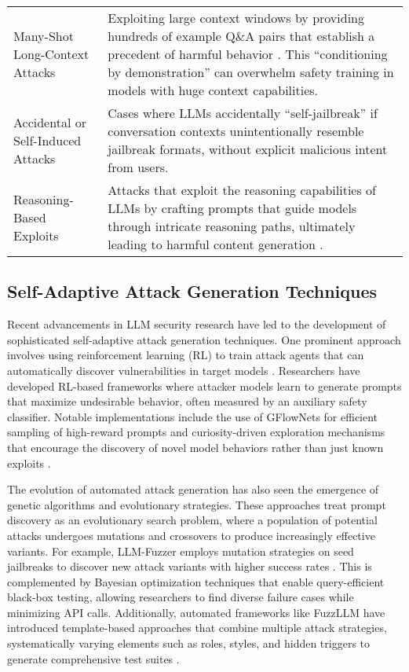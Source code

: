 \begin{longtable}{>{\raggedright\arraybackslash}p{}>{\raggedright\arraybackslash}p{}}
    Many-Shot Long-Context Attacks & Exploiting large context windows by providing hundreds of example Q\&A pairs that establish a precedent of harmful behavior \citep{Anthropic2024a, Anthropic2024b}. This ``conditioning by demonstration'' can overwhelm safety training in models with huge context capabilities. \\
    
    Accidental or Self-Induced Attacks & Cases where LLMs accidentally ``self-jailbreak'' if conversation contexts unintentionally resemble jailbreak formats, without explicit malicious intent from users. \\
    
    Reasoning-Based Exploits & Attacks that exploit the reasoning capabilities of LLMs by crafting prompts that guide models through intricate reasoning paths, ultimately leading to harmful content generation \citep{ReasoningJailbreak2024}. \\
    
    \end{longtable}

    
    \subsection{Self-Adaptive Attack Generation Techniques}

    Recent advancements in LLM security research have led to the development of sophisticated self-adaptive attack generation techniques. One prominent approach involves using reinforcement learning (RL) to train attack agents that can automatically discover vulnerabilities in target models \citep{RedTeamSurvey2024}. Researchers have developed RL-based frameworks where attacker models learn to generate prompts that maximize undesirable behavior, often measured by an auxiliary safety classifier. Notable implementations include the use of GFlowNets for efficient sampling of high-reward prompts and curiosity-driven exploration mechanisms that encourage the discovery of novel model behaviors rather than just known exploits \citep{RedTeamSurvey2024}.
    
    The evolution of automated attack generation has also seen the emergence of genetic algorithms and evolutionary strategies. These approaches treat prompt discovery as an evolutionary search problem, where a population of potential attacks undergoes mutations and crossovers to produce increasingly effective variants. For example, LLM-Fuzzer employs mutation strategies on seed jailbreaks to discover new attack variants with higher success rates \citep{LLMFuzzer2024}. This is complemented by Bayesian optimization techniques that enable query-efficient black-box testing, allowing researchers to find diverse failure cases while minimizing API calls. Additionally, automated frameworks like FuzzLLM have introduced template-based approaches that combine multiple attack strategies, systematically varying elements such as roles, styles, and hidden triggers to generate comprehensive test suites \citep{FuzzLLM2024}.
    
